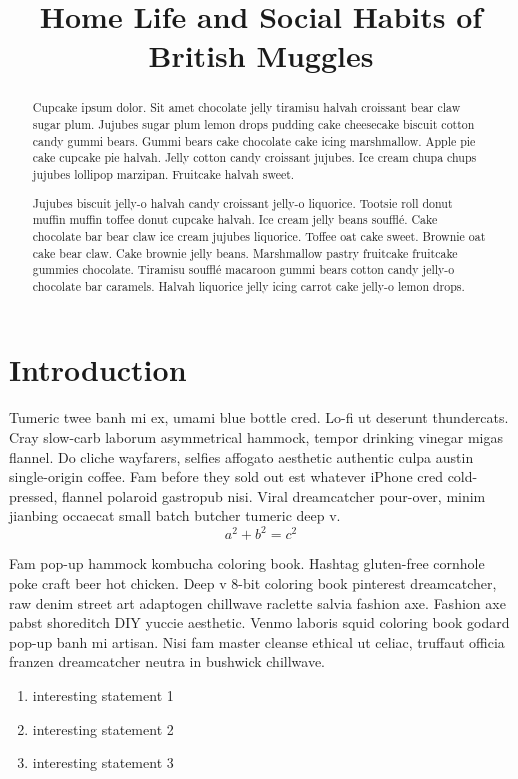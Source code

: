 \documentclass[ma491]{swumath}
\title{Home Life and Social Habits of British Muggles}
\begin{document}
\frontmatter

\maketitle
\makeapprovalpage
\begin{abstract}
	Cupcake ipsum dolor. Sit amet chocolate jelly tiramisu halvah croissant bear claw sugar plum. Jujubes sugar plum lemon drops pudding cake cheesecake biscuit cotton candy gummi bears. Gummi bears cake chocolate cake icing marshmallow. Apple pie cake cupcake pie halvah. Jelly cotton candy croissant jujubes. Ice cream chupa chups jujubes lollipop marzipan. Fruitcake halvah sweet.

Jujubes biscuit jelly-o halvah candy croissant jelly-o liquorice. Tootsie roll donut muffin muffin toffee donut cupcake halvah. Ice cream jelly beans soufflé. Cake chocolate bar bear claw ice cream jujubes liquorice. Toffee oat cake sweet. Brownie oat cake bear claw. Cake brownie jelly beans. Marshmallow pastry fruitcake fruitcake gummies chocolate. Tiramisu soufflé macaroon gummi bears cotton candy jelly-o chocolate bar caramels. Halvah liquorice jelly icing carrot cake jelly-o lemon drops.
\end{abstract}
\tableofcontents
\listoftables
\listoffigures

\mainmatter

\chapter{Introduction}
Tumeric twee banh mi ex, umami blue bottle cred. Lo-fi ut deserunt thundercats. Cray slow-carb laborum asymmetrical hammock, tempor drinking vinegar migas flannel. Do cliche wayfarers, selfies affogato aesthetic authentic culpa austin single-origin coffee. Fam before they sold out est whatever iPhone cred cold-pressed, flannel polaroid gastropub nisi. Viral dreamcatcher pour-over, minim jianbing occaecat small batch butcher tumeric deep v.
\begin{equation}
a^2+b^2=c^2
\end{equation}

Fam pop-up hammock kombucha coloring book. Hashtag gluten-free cornhole poke craft beer hot chicken. Deep v 8-bit coloring book pinterest dreamcatcher, raw denim street art adaptogen chillwave raclette salvia fashion axe. Fashion axe pabst shoreditch DIY yuccie aesthetic. Venmo laboris squid coloring book godard pop-up banh mi artisan. Nisi fam master cleanse ethical ut celiac, truffaut officia franzen dreamcatcher neutra in bushwick chillwave.
\begin{enumerate}
\item interesting statement 1
\item interesting statement 2
\item interesting statement 3
\end{enumerate}
\end{document}
